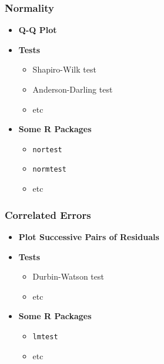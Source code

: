 \documentclass[serif,mathserif,professionalfont]{beamer}
\begin{document}
\begin{frame}
	
	\frametitle{Normality}
	
	\begin{itemize}
		\item \textbf{Q-Q Plot}
		\item \textbf{Tests}
		\begin{itemize}
			\item Shapiro-Wilk test
			\item Anderson-Darling test
			\item etc
		\end{itemize}
		\item \textbf{Some R Packages}
		\begin{itemize}
			\item \texttt{nortest}
			\item \texttt{normtest}
			\item etc
		\end{itemize}
	\end{itemize}
	
	
	
\end{frame}


\begin{frame}
	
	\frametitle{Correlated Errors}
	
	\begin{itemize}
		\item \textbf{Plot Successive Pairs of Residuals}
		\item \textbf{Tests}
		\begin{itemize}
			\item Durbin-Watson test
			\item etc
		\end{itemize}
		\item \textbf{Some R Packages}
		\begin{itemize}
			\item \texttt{lmtest}
			\item etc
		\end{itemize}
	\end{itemize}
	
	
	
\end{frame}
\end{document}
